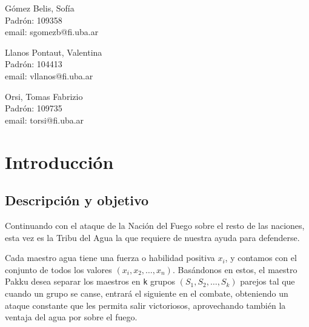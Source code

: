 \documentclass{article}
\begin{document}
\begin{titlepage}
\begin{center}
    {\begin{minipage}[t]{.32\textwidth}
        \begin{center}
          Gómez Belis, Sofía\\
          {\small{Padrón: 109358}}\\
          {\small{email: sgomezb@fi.uba.ar}}
        \end{center}
          \end{minipage}
          \begin{minipage}[t]{.32\textwidth}
        \begin{center}
          Llanos Pontaut, Valentina\\
          {\small{Padrón: 104413}}\\
          {\small{email: vllanos@fi.uba.ar}}\\
        \end{center}
      \end{minipage}
      \begin{minipage}[t]{.32\textwidth}
        \begin{center}
          Orsi, Tomas Fabrizio\\
          {\small{Padrón: 109735}}\\
          {\small{email: torsi@fi.uba.ar}}
        \end{center}
      \end{minipage}}

  \end{center}
\end{titlepage}

\renewcommand*\contentsname{Indice}
\tableofcontents
\pagebreak

\section{Introducción}
\subsection{Descripción y objetivo}
\label{sec:descripcion}

Continuando con el ataque de la Nación del Fuego sobre el resto de las naciones, esta vez es la Tribu del Agua la que requiere de nuestra ayuda para defenderse. 

Cada maestro agua tiene una fuerza o habilidad positiva $x_i$, y contamos con el conjunto de todos los valores $(x_i, x_2, \dots, x_n)$. Basándonos en estos, el maestro Pakku desea separar los maestros en \texttt{k} grupos $(S_1, S_2, \dots, S_k)$ parejos tal que cuando un grupo se canse, entrará el siguiente en el combate, obteniendo un ataque constante que les permita salir victoriosos, aprovechando también la ventaja del agua por sobre el fuego.
\end{document}
